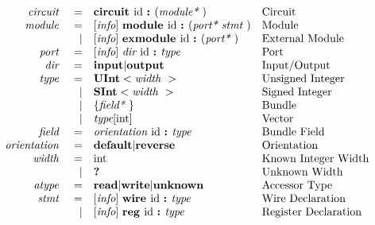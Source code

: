 \documentclass[12pt]{article}
\begin{document}
\[
\begin{array}{rrll}
\text{\em circuit\ }    &=     &\text{\bf circuit\ } \text{id } \text{\bf :\ } (\text{\em module*\ })                                        &\text{Circuit}\\
\text{\em module\ }     &=     &[\text{\em info}]\  \text{\bf module\ }  \text{id } \text{\bf :\ } (\text{\em port*\ } \text{\em stmt\ })                          &\text{Module}\\
                &\vert &[\text{\em info}]\  \text{\bf exmodule\ }  \text{id } \text{\bf :\ } (\text{\em port*\ })                                  &\text{External Module}\\
\text{\em port\ }       &=     &[\text{\em info}]\  \text{\em dir\ } \text{id } \text{\bf :\ } \text{\em type\ }                                           &\text{Port}\\
\text{\em dir\ }        &=     &\text{\bf input} \vert \text{\bf output}                                                &\text{Input/Output}\\
\text{\em type\ }       &=     &\text{\bf UInt}<\text{\em width\ }>                                                        &\text{Unsigned Integer}\\
                &\vert &\text{\bf SInt}<\text{\em width\ }>                                                        &\text{Signed Integer}\\
                &\vert &\{\text{\em field*\ }\}                                                         &\text{Bundle}\\
                &\vert &\text{\em type}[\text{int}]                                                             &\text{Vector}\\
\text{\em field\ }      &=     &\text{\em orientation\ } \text{id } \text{\bf :\ } \text{\em type\ }                                         &\text{Bundle Field}\\
\text{\em orientation\ }&=     &\text{\bf default} \vert \text{\bf reverse}                                             &\text{Orientation}\\
\text{\em width\ }      &=     &\text{int}                                                                         &\text{Known Integer Width}\\
                &\vert &\text{\bf ?\ }                                                                        &\text{Unknown Width}\\
\text{\em atype\ }      &=     &\text{\bf read} \vert \text{\bf write} \vert \text{\bf unknown}                              &\text{Accessor Type}\\
\text{\em stmt\ }       &=     &[\text{\em info}]\  \text{\bf wire\ } \text{id } \text{\bf :\ } \text{\em type\ }                                          &\text{Wire Declaration}\\
                &\vert &[\text{\em info}]\  \text{\bf reg\ } \text{id } \text{\bf :\ } \text{\em type\ }                                           &\text{Register Declaration}\\

\end{array}\]
\end{document}
